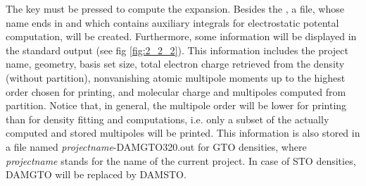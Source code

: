 \documentclass[10pt]{article}
\begin{document}
The key \exec must be pressed to compute the expansion. Besides the \damqt{ },
a file, whose name ends in \dmqtv{ } and which contains auxiliary 
integrals for electrostatic potental computation, will be created. Furthermore, 
some information will be displayed in the standard output
(see fig \ref{fig:2_2_2}). This information includes the
project name, geometry, basis set size, total electron charge retrieved from the density 
(without partition), nonvanishing atomic multipole moments up to the highest order chosen for printing,
and molecular charge and multipoles computed from partition. Notice that, in general,
the multipole order will be lower for printing than for density fitting and computations, i.e.
only a subset of the actually computed and stored multipoles will be printed.
This information is also stored in a file named {\it projectname}-DAMGTO320.out 
for GTO densities,
where {\it projectname} stands for the name of the current project. In case of STO densities,
DAMGTO will be replaced by DAMSTO.

\vspace*{0.3cm}
\end{document}
